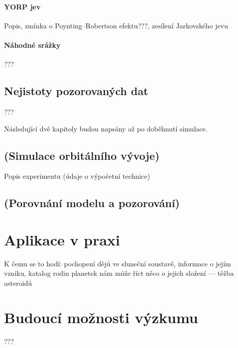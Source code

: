 \documentclass[A4paper, 12pt, oneside]{book}
\begin{document}
\subsubsection{YORP jev}
Popis, zmínka o Poynting–Robertson efektu???, zesílení Jarkovského jevu
\subsubsection{Náhodné srážky}
???
\section{Nejistoty pozorovaných dat}
???

Následující dvě kapitoly budou napsány až po doběhnutí simulace. 
\section{(Simulace orbitálního vývoje)}
Popis experimentu (údaje o výpočetní technice)
\section{(Porovnání modelu a pozorování)}

\chapter{Aplikace v praxi} 
K čemu se to hodí: pochopení dějů ve sluneční soustavě, informace o jejím vzniku, katalog rodin planetek nám může říct něco o jejich složení --- těžba asteroidů
\chapter{Budoucí možnosti výzkumu}
???
\printbibliography
\end{document}
